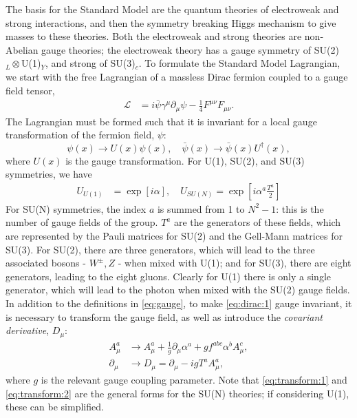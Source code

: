 \documentclass[a4paper,12pt]{article}
\begin{document}
The basis for the Standard Model are the quantum theories of electroweak and strong interactions, and then the symmetry breaking Higgs mechanism to give masses to these theories.
Both the electroweak and strong theories are non-Abelian gauge theories; the electroweak theory has a gauge symmetry of SU(2)$_{L}\otimes$U(1)$_Y$, and strong of SU(3)$_{c}$.
To formulate the Standard Model Lagrangian, we start with the free Lagrangian of a massless Dirac fermion coupled to a gauge field tensor,
\begin{align}
    \label{eq:dirac:1}
    \mathcal{L} &= i\bar{\psi}\gamma^\mu\partial_\mu\psi - \frac14F^{\mu\nu}F_{\mu\nu}.
\end{align}
The Lagrangian must be formed such that it is invariant for a local gauge transformation of the fermion field, $\psi$:
\begin{equation}
    \label{eq:local}
    \psi(x)\to U(x)\psi(x),\quad \bar{\psi}(x)\to\bar{\psi}(x)U^\dagger(x),
\end{equation}
where $U(x)$ is the gauge transformation.
For U(1), SU(2), and SU(3) symmetries, we have
\begin{align}
    \label{eq:gauge} 
    U_{U(1)} &= \exp\left[i\alpha\right],\quad U_{SU(N)} = \exp\left[i\alpha^a\frac{T^a}{2}\right]
\end{align}
For SU(N) symmetries, the index $a$ is summed from 1 to $N^2-1$: this is the number of gauge fields of the group.
$T^a$ are the generators of these fields, which are represented by the Pauli matrices for SU(2) and the Gell-Mann matrices for SU(3).
For SU(2), there are three generators, which will lead to the three associated bosons - $W^{\pm},Z$ - when mixed with U(1); and for SU(3), there are eight generators, leading to the eight gluons.
Clearly for U(1) there is only a single generator, which will lead to the photon when mixed with the SU(2) gauge fields.\\
In addition to the definitions in \eqref{eq:gauge}, to make \eqref{eq:dirac:1} gauge invariant, it is necessary to transform the gauge field, as well as introduce the \textit{covariant derivative}, $D_\mu$:
\begin{align}
    \label{eq:transform:1}
    A^a_\mu &\to A^a_\mu + \frac{1}{g}\partial_\mu\alpha^a + gf^{abc}\alpha^bA^c_\mu, \\
    \label{eq:transform:2}
    \partial_\mu &\to D_\mu = \partial_\mu - igT^aA^a_\mu,
\end{align}
where $g$ is the relevant gauge coupling parameter.
Note that \eqref{eq:transform:1} and \eqref{eq:transform:2} are the general forms for the SU(N) theories; if considering U(1), these can be simplified.\\
\end{document}
